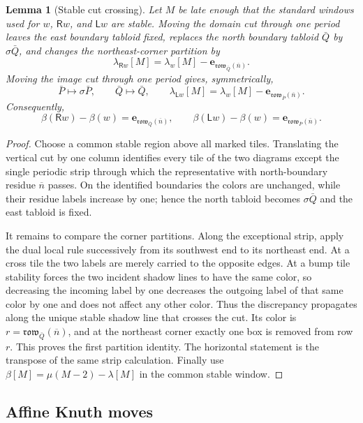 \documentclass[11pt]{article}
\newtheorem{lemma}[theorem]{Lemma}
\theoremstyle{definition}
\theoremstyle{remark}
\newcommand{\ol}[1]{\overline{#1}}
\newcommand{\row}{\mathfrak{row}}
\newcommand{\e}{\mathbf e}
\newcommand{\Rop}{\mathsf R}
\newcommand{\Lop}{\mathsf L}
\begin{document}
\begin{lemma}[Stable cut crossing]\label{lem:stable-cut}
Let \(M\) be late enough that the standard windows used for \(w\), \(\Rop w\), and
\(\Lop w\) are stable.  Moving the domain cut through one period leaves the east
boundary tabloid fixed, replaces the north boundary tabloid \(\bar Q\) by
\(\sigma\bar Q\), and changes the northeast-corner partition by
\[
 \lambda_{\Rop w}[M]=\lambda_w[M]-\e_{\row_{\bar Q}(\ol n)}.
\]
Moving the image cut through one period gives, symmetrically,
\[
 \bar P\longmapsto\sigma\bar P,\qquad
 \bar Q\longmapsto\bar Q,\qquad
 \lambda_{\Lop w}[M]=\lambda_w[M]-\e_{\row_{\bar P}(\ol n)}.
\]
Consequently,
\[
 \beta(\Rop w)-\beta(w)=\e_{\row_{\bar Q}(\ol n)},\qquad
 \beta(\Lop w)-\beta(w)=\e_{\row_{\bar P}(\ol n)}.
\]
\end{lemma}

\begin{proof}
Choose a common stable region above all marked tiles.  Translating the vertical cut by
one column identifies every tile of the two diagrams except the single periodic strip
through which the representative with north-boundary residue \(\ol n\) passes.  On the
identified boundaries the colors are unchanged, while their residue labels increase by
one; hence the north tabloid becomes \(\sigma\bar Q\) and the east tabloid is fixed.

It remains to compare the corner partitions.  Along the exceptional strip, apply the
dual local rule successively from its southwest end to its northeast end.  At a cross
tile the two labels are merely carried to the opposite edges.  At a bump tile stability
forces the two incident shadow lines to have the same color, so decreasing the incoming
label by one decreases the outgoing label of that same color by one and does not affect
any other color.  Thus the discrepancy propagates along the unique stable shadow line
that crosses the cut.  Its color is \(r=\row_{\bar Q}(\ol n)\), and at the northeast
corner exactly one box is removed from row \(r\).  This proves the first partition
identity.  The horizontal statement is the transpose of the same strip calculation.
Finally use \(\beta[M]=\mu(M-2)-\lambda[M]\) in the common stable window.
\end{proof}

\subsection{Affine Knuth moves}
\end{document}
